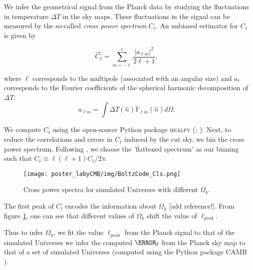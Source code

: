 We infer the geometrical signal from the Planck data by studying the fluctuations in temperature $\Delta T$ in the sky maps. These fluctuations in the signal can be measured by the so-called \textit{cross power spectrum} $C_{\ell}$. An unbiased estimator for $C_{\ell}$ \cite{tristram:2005} is given by 

\begin{equation}
\widehat{C_{\ell}}=\sum_{m=-\ell}^{\ell} \frac{\left|a_{\ell m}\right|^{2}}{2 \ell+1},
\end{equation}
\vspace{1em}

where $\ell$ corresponds to the multipole (associated with an angular size) and $a_{\ell}$ corresponds to the Fourier coefficients of the spherical harmonic decomposition of $\Delta T$:
\begin{equation}
a_{\ell m}=\int \Delta T(\hat{n}) Y_{\ell m}(\hat{n}) d \Omega.
\end{equation}
\vspace{1em}

We compute $C_{\ell}$ using the open-source Python package \textsc{healpy} (\cite{healpy:2019}; \cite{healpix:2005}). Next, to reduce the correlations and errors in $C_{\ell}$ induced by the cut sky, we bin the cross power spectrum. Following \cite{hivon:2002}, we choose the 'flattened spectrum' as our binning such that $C_{\ell} \equiv \ell(\ell+1) C_{\ell} / 2 \pi$.


\vspace{0.2em}
\begin{figure}
	\begin{minipage}{.94\textwidth}
		\centering\texttt{[image: poster\_labyCMB/img/BoltzCode\_Cls.png]}
		\caption{Cross power spectra for simulated Universes with different $\Omega_k$.}
		\label{fig: boltz_Cls}
	\end{minipage}
\end{figure}
\vspace{0.4em}


The first peak of $C_l$ encodes the information about $\Omega_k$ [add reference!]. From figure \ref{fig: boltz_Cls}, one can see that different values of $\Omega_k$ shift the value of $\ell_{peak}$.

Thus to infer $\Omega_k$, we fit the value $\ell_{peak}$ from the Planck signal to that of the simulated Universes
we infer the computed $\C_{\ell}$ from the Planck sky map to that of a set of simulated Universes (computed using the Python package \textsc{CAMB} \cite{camb:2011}).
